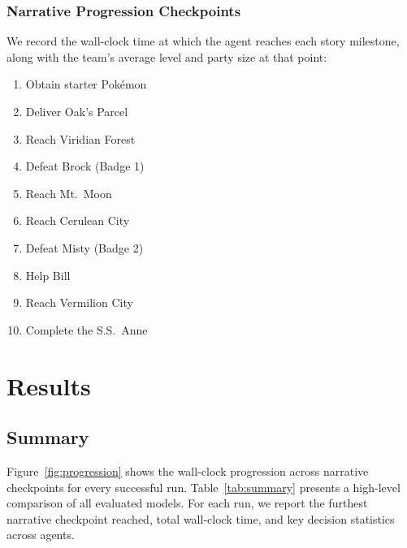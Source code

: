 \documentclass{article}
\begin{document}
\subsubsection{Narrative Progression Checkpoints}

We record the wall-clock time at which the agent reaches each story milestone, along with the team's average level and party size at that point:

\begin{enumerate}
  \item Obtain starter Pok\'{e}mon
  \item Deliver Oak's Parcel
  \item Reach Viridian Forest
  \item Defeat Brock (Badge 1)
  \item Reach Mt.\ Moon
  \item Reach Cerulean City
  \item Defeat Misty (Badge 2)
  \item Help Bill
  \item Reach Vermilion City
  \item Complete the S.S.\ Anne
\end{enumerate}


\section{Results}
\label{sec:results}

\subsection{Summary}

Figure~\ref{fig:progression} shows the wall-clock progression across narrative checkpoints for every successful run. Table~\ref{tab:summary} presents a high-level comparison of all evaluated models. For each run, we report the furthest narrative checkpoint reached, total wall-clock time, and key decision statistics across agents.
\end{document}
